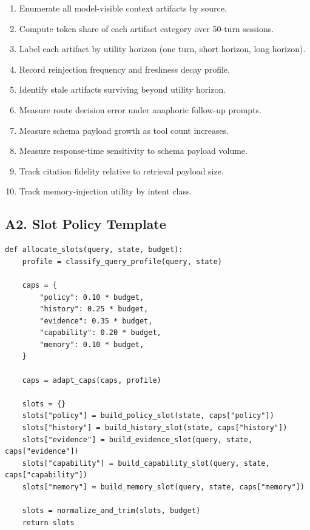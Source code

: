 \documentclass[conference]{IEEEtran}
\begin{document}
\begin{enumerate}[leftmargin=1.2em]
\item Enumerate all model-visible context artifacts by source.
\item Compute token share of each artifact category over 50-turn sessions.
\item Label each artifact by utility horizon (one turn, short horizon, long horizon).
\item Record reinjection frequency and freshness decay profile.
\item Identify stale artifacts surviving beyond utility horizon.
\item Measure route decision error under anaphoric follow-up prompts.
\item Measure schema payload growth as tool count increases.
\item Measure response-time sensitivity to schema payload volume.
\item Track citation fidelity relative to retrieval payload size.
\item Track memory-injection utility by intent class.
\end{enumerate}

\subsection*{A2. Slot Policy Template}

\begin{lstlisting}[style=pythonStyle, caption={Pseudo-template for context slot policy implementation.}, label={lst:slot_template}]
def allocate_slots(query, state, budget):
    profile = classify_query_profile(query, state)

    caps = {
        "policy": 0.10 * budget,
        "history": 0.25 * budget,
        "evidence": 0.35 * budget,
        "capability": 0.20 * budget,
        "memory": 0.10 * budget,
    }

    caps = adapt_caps(caps, profile)

    slots = {}
    slots["policy"] = build_policy_slot(state, caps["policy"])
    slots["history"] = build_history_slot(state, caps["history"])
    slots["evidence"] = build_evidence_slot(query, state, caps["evidence"])
    slots["capability"] = build_capability_slot(query, state, caps["capability"])
    slots["memory"] = build_memory_slot(query, state, caps["memory"])

    slots = normalize_and_trim(slots, budget)
    return slots
\end{lstlisting}
\end{document}
